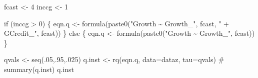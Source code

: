 \documentclass[
  letterpaper,
]{book}
\newenvironment{Shaded}{\begin{snugshade}}{\end{snugshade}}
\newcommand{\AttributeTok}[1]{\textcolor[rgb]{0.40,0.45,0.13}{#1}}
\newcommand{\CommentTok}[1]{\textcolor[rgb]{0.37,0.37,0.37}{#1}}
\newcommand{\ControlFlowTok}[1]{\textcolor[rgb]{0.00,0.23,0.31}{#1}}
\newcommand{\DecValTok}[1]{\textcolor[rgb]{0.68,0.00,0.00}{#1}}
\newcommand{\FunctionTok}[1]{\textcolor[rgb]{0.28,0.35,0.67}{#1}}
\newcommand{\NormalTok}[1]{\textcolor[rgb]{0.00,0.23,0.31}{#1}}
\newcommand{\OtherTok}[1]{\textcolor[rgb]{0.00,0.23,0.31}{#1}}
\newcommand{\SpecialCharTok}[1]{\textcolor[rgb]{0.37,0.37,0.37}{#1}}
\newcommand{\StringTok}[1]{\textcolor[rgb]{0.13,0.47,0.30}{#1}}
\begin{document}
\begin{Shaded}
\begin{Highlighting}[]
\NormalTok{fcast }\OtherTok{\textless{}{-}} \DecValTok{4}
\NormalTok{inccg }\OtherTok{\textless{}{-}} \DecValTok{1}

\ControlFlowTok{if}\NormalTok{ (inccg }\SpecialCharTok{\textgreater{}} \DecValTok{0}\NormalTok{) \{}
\NormalTok{  eqn.q }\OtherTok{\textless{}{-}} \FunctionTok{formula}\NormalTok{(}\FunctionTok{paste0}\NormalTok{(}\StringTok{"Growth \textasciitilde{} Growth\_"}\NormalTok{, fcast, }\StringTok{" + GCredit\_"}\NormalTok{, fcast))}
\NormalTok{\} }\ControlFlowTok{else}\NormalTok{ \{}
\NormalTok{  eqn.q }\OtherTok{\textless{}{-}} \FunctionTok{formula}\NormalTok{(}\FunctionTok{paste0}\NormalTok{(}\StringTok{"Growth \textasciitilde{} Growth\_"}\NormalTok{, fcast))  }
\NormalTok{\}}

\NormalTok{qvals  }\OtherTok{\textless{}{-}} \FunctionTok{seq}\NormalTok{(.}\DecValTok{05}\NormalTok{,.}\DecValTok{95}\NormalTok{,.}\DecValTok{025}\NormalTok{)}
\NormalTok{q.inst }\OtherTok{\textless{}{-}} \FunctionTok{rq}\NormalTok{(eqn.q, }\AttributeTok{data=}\NormalTok{dataz, }\AttributeTok{tau=}\NormalTok{qvals)}
\CommentTok{\# summary(q.inst)}
\NormalTok{q.inst}
\end{Highlighting}
\end{Shaded}
\end{document}
